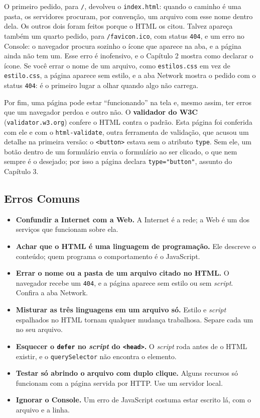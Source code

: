O primeiro pedido, para \texttt{/}, devolveu o \texttt{index.html}: quando o caminho é uma pasta, os servidores procuram, por convenção, um arquivo com esse nome dentro dela. Os outros dois foram feitos porque o HTML os citou. Talvez apareça também um quarto pedido, para \texttt{/favicon.ico}, com status \texttt{404}, e um erro no Console: o navegador procura sozinho o ícone que aparece na aba, e a página ainda não tem um. Esse erro é inofensivo, e o Capítulo 2 mostra como declarar o ícone. Se você errar o nome de um arquivo, como \texttt{estilos.css} em vez de \texttt{estilo.css}, a página aparece sem estilo, e a aba Network mostra o pedido com o status \texttt{404}: é o primeiro lugar a olhar quando algo não carrega.

Por fim, uma página pode estar ``funcionando'' na tela e, mesmo assim, ter erros que um navegador perdoa e outro não. O \textbf{validador do W3C} (\texttt{validator.w3.org}) confere o HTML contra o padrão. Esta página foi conferida com ele e com o \texttt{html-validate}, outra ferramenta de validação, que acusou um detalhe na primeira versão: o \texttt{<button>} estava sem o atributo \texttt{type}. Sem ele, um botão dentro de um formulário envia o formulário ao ser clicado, o que nem sempre é o desejado; por isso a página declara \texttt{type="button"}, assunto do Capítulo 3.

\subsection{Erros Comuns}

\begin{itemize}
  \item \textbf{Confundir a Internet com a Web.} A Internet é a rede; a Web é um dos serviços que funcionam sobre ela.
  \item \textbf{Achar que o HTML é uma linguagem de programação.} Ele descreve o conteúdo; quem programa o comportamento é o JavaScript.
  \item \textbf{Errar o nome ou a pasta de um arquivo citado no HTML.} O navegador recebe um \texttt{404}, e a página aparece sem estilo ou sem \textit{script}. Confira a aba Network.
  \item \textbf{Misturar as três linguagens em um arquivo só.} Estilo e \textit{script} espalhados no HTML tornam qualquer mudança trabalhosa. Separe cada um no seu arquivo.
  \item \textbf{Esquecer o \texttt{defer} no \textit{script} do \texttt{<head>}.} O \textit{script} roda antes de o HTML existir, e o \texttt{querySelector} não encontra o elemento.
  \item \textbf{Testar só abrindo o arquivo com duplo clique.} Alguns recursos só funcionam com a página servida por HTTP. Use um servidor local.
  \item \textbf{Ignorar o Console.} Um erro de JavaScript costuma estar escrito lá, com o arquivo e a linha.
\end{itemize}
